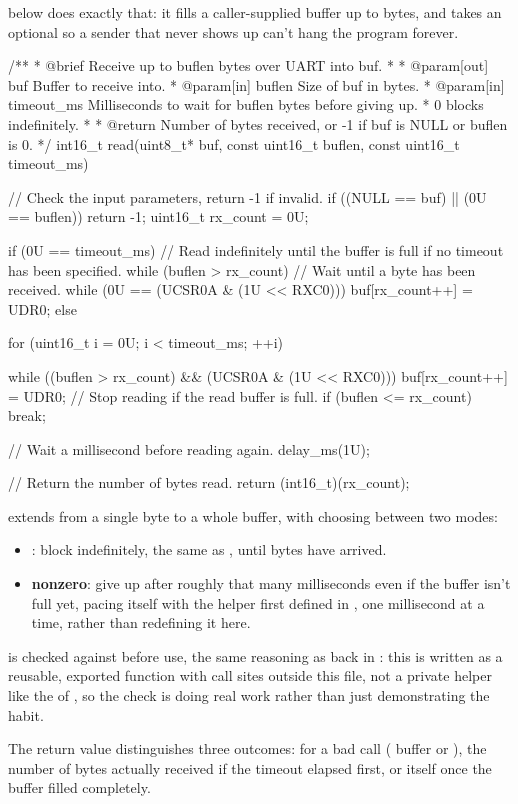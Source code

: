  below does exactly that: it fills a caller-supplied buffer up to  bytes,
and takes an optional  so a sender that never shows up can't hang the program
forever.

\begin{ccode}
/**
 * @brief Receive up to buflen bytes over UART into buf.
 *
 * @param[out] buf Buffer to receive into.
 * @param[in] buflen Size of buf in bytes.
 * @param[in] timeout_ms Milliseconds to wait for buflen bytes before giving up.
 *            0 blocks indefinitely.
 *
 * @return Number of bytes received, or -1 if buf is NULL or buflen is 0.
 */
int16_t read(uint8_t* buf, const uint16_t buflen, const uint16_t timeout_ms)
{
    // Check the input parameters, return -1 if invalid.
    if ((NULL == buf) || (0U == buflen)) { return -1; }
    uint16_t rx_count = 0U;

    if (0U == timeout_ms)
    {
        // Read indefinitely until the buffer is full if no timeout has been specified.
        while (buflen > rx_count)
        {
            // Wait until a byte has been received.
            while (0U == (UCSR0A & (1U << RXC0))) {}
            buf[rx_count++] = UDR0;
        }
    }
    else
    {
        for (uint16_t i = 0U; i < timeout_ms; ++i)
        {
            while ((buflen > rx_count) && (UCSR0A & (1U << RXC0)))
            {
                buf[rx_count++] = UDR0;
            }
            // Stop reading if the read buffer is full.
            if (buflen <= rx_count) { break; }

            // Wait a millisecond before reading again.
            delay_ms(1U);
        }
    }
    // Return the number of bytes read.
    return (int16_t)(rx_count);
}
\end{ccode}

\noindent{} extends  from a single byte to a whole buffer,
with  choosing between two modes:
\begin{itemize}
  \item \textbf{}: block indefinitely, the same as
    , until  bytes have arrived.
  \item \textbf{ nonzero}: give up after roughly that many milliseconds even if
    the buffer isn't full yet, pacing itself with the  helper first defined in
    , one millisecond at a time, rather than redefining it here.
\end{itemize}
 is checked against  before use, the same reasoning as 
back in : this is written as a reusable, exported function with call sites outside
this file, not a private helper like the  of , so the check is
doing real work rather than just demonstrating the habit.

The return value distinguishes three outcomes:  for a bad call ( buffer or
), the number of bytes actually received if the timeout elapsed first, or
 itself once the buffer filled completely.

